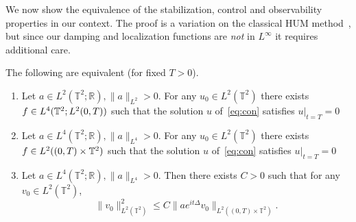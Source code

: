 \documentclass[AHL, Unicode, longabstracts]{cedram}
\newcommand{\R}{{\mathbb R}}
\newcommand{\TT}{{\mathbb T}}
\newcommand{\TT}{{\mathbb T}}
\newcommand{\R}{{\mathbb R}}
\begin{document}
We now show the equivalence of the stabilization, control and observability properties in our context. The proof is a variation on the classical HUM method~\cite{Li}, but since our damping and localization functions are \emph{not} in $L^\infty$ it requires additional care.
\begin{prop}\label{p:hum}
The following are equivalent (for fixed $T>0$).
\begin{enumerate}
\item \label{i}
Let $a \in L^2(\TT^2;\R), \| a \|_{L^2} >0$. For any $u_0\in L^2(\TT^2)$ there exists $f \in\linebreak L^4(\TT^2 ; L^2(0,T))$ such that the solution $u$ of~\eqref{eq:con} satisfies $u|_{t=T} =0$
\item \label{ii}
Let $a \in L^4(\TT^2;\R), \| a \|_{L^4} >0$. For any $u_0\in L^2(\TT^2)$ there exists $f \in\linebreak L^2((0,T)\times \TT^2)$ such that the solution $u$ of~\eqref{eq:con} satisfies $u |_{t=T} =0$
\item \label{iii}
Let $a \in L^4(\TT^2;\R), \| a \|_{L^4} >0$. Then there exists $C>0$ such that for any $v_0 \in L^2(\TT^2)$,
\begin{equation}\label{observation}
\| v_0 \|_{L^2(\TT^2)}^2 \leq C \| a e^{it \Delta} v_0 \| _{L^2((0,T) \times \TT^2)}.
\end{equation}
\end{enumerate}
\end{prop}
\end{document}

